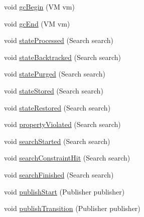 \begin{DoxyCompactItemize}
\item 
void \hyperlink{classgov_1_1nasa_1_1jpf_1_1inspector_1_1server_1_1jpf_1_1_inspector_listener_aaef3bc3ee4d54eaf8e91ded052b93191}{gc\+Begin} (VM vm)
\item 
void \hyperlink{classgov_1_1nasa_1_1jpf_1_1inspector_1_1server_1_1jpf_1_1_inspector_listener_a1b3282a38f231f4e95c30f32ff7f2916}{gc\+End} (VM vm)
\item 
void \hyperlink{classgov_1_1nasa_1_1jpf_1_1inspector_1_1server_1_1jpf_1_1_inspector_listener_a13e06f138eabbbeb7bb89c1db6e760aa}{state\+Processed} (Search search)
\item 
void \hyperlink{classgov_1_1nasa_1_1jpf_1_1inspector_1_1server_1_1jpf_1_1_inspector_listener_aa52fd231f8bf6e7e5bdc49479ff443f2}{state\+Backtracked} (Search search)
\item 
void \hyperlink{classgov_1_1nasa_1_1jpf_1_1inspector_1_1server_1_1jpf_1_1_inspector_listener_ab6798ed8555973991f9cd6e6bc6577e7}{state\+Purged} (Search search)
\item 
void \hyperlink{classgov_1_1nasa_1_1jpf_1_1inspector_1_1server_1_1jpf_1_1_inspector_listener_ab9fdcb213cad39690fde77688b7ddd62}{state\+Stored} (Search search)
\item 
void \hyperlink{classgov_1_1nasa_1_1jpf_1_1inspector_1_1server_1_1jpf_1_1_inspector_listener_ab7f12b7e5459b0da31fa94d5c251bf37}{state\+Restored} (Search search)
\item 
void \hyperlink{classgov_1_1nasa_1_1jpf_1_1inspector_1_1server_1_1jpf_1_1_inspector_listener_a159a6fd5698f147877544a41d4744935}{property\+Violated} (Search search)
\item 
void \hyperlink{classgov_1_1nasa_1_1jpf_1_1inspector_1_1server_1_1jpf_1_1_inspector_listener_a2a6fe432d87b1d793dcacb7c3bba3cf0}{search\+Started} (Search search)
\item 
void \hyperlink{classgov_1_1nasa_1_1jpf_1_1inspector_1_1server_1_1jpf_1_1_inspector_listener_a9a129662fccc976bba28920370be2abd}{search\+Constraint\+Hit} (Search search)
\item 
void \hyperlink{classgov_1_1nasa_1_1jpf_1_1inspector_1_1server_1_1jpf_1_1_inspector_listener_a60f4cb2518ace956f666fd48f1df4b86}{search\+Finished} (Search search)
\item 
void \hyperlink{classgov_1_1nasa_1_1jpf_1_1inspector_1_1server_1_1jpf_1_1_inspector_listener_ae88dd5eaf0d125eaa284631a7541e7bd}{publish\+Start} (Publisher publisher)
\item 
void \hyperlink{classgov_1_1nasa_1_1jpf_1_1inspector_1_1server_1_1jpf_1_1_inspector_listener_a9a58c7898d43081db2f33825a0e79a7c}{publish\+Transition} (Publisher publisher)

\end{DoxyCompactItemize}
